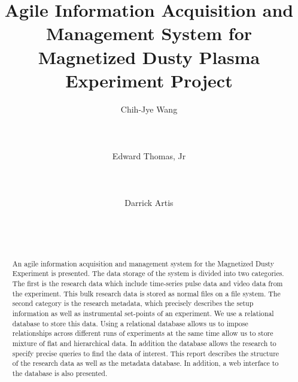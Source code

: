 \documentclass{sig-alternate}
\begin{document}
\title{Agile Information Acquisition and Management System for Magnetized Dusty Plasma Experiment Project}



\author{
\alignauthor Chih-Jye Wang\\
      \\
      \\
     \\
\alignauthor Edward Thomas, Jr\\
      \\
      \\
     \\
\alignauthor Darrick Artis\\
      \\
      \\
     \\
}




\maketitle

\begin{abstract}
An agile information acquisition and management system for the Magnetized Dusty Experiment is presented. The data storage of the system is divided into two categories. The first is the research data which include time-series pulse data and video data from the experiment. This bulk research data is stored as normal files on a file system. The second category is the research metadata, which precisely describes the setup information as well as instrumental set-points of an experiment. We use a relational database to store this data. Using a relational database allows us to impose relationships across different runs of experiments at the same time allow us to store mixture of flat and hierarchical data. In addition the database allows the research to specify precise queries to find the data of interest. This report describes the structure of the research data as well as the metadata database. In addition, a web interface to the database is also presented.
\end{abstract}
\end{document}
